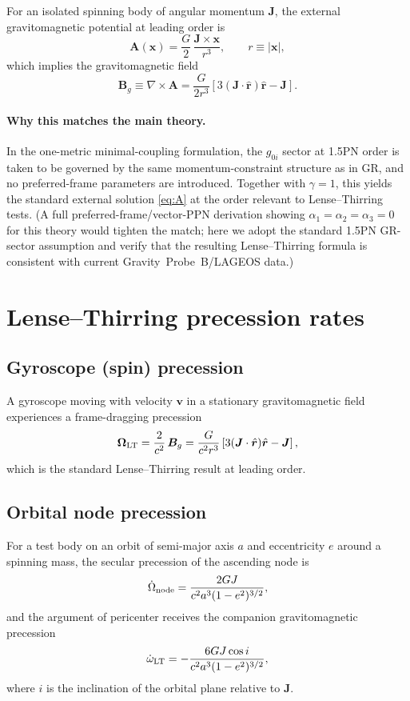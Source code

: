 \documentclass[11pt]{article}
\begin{document}
For an isolated spinning body of angular momentum $\bm{J}$, the external gravitomagnetic potential at leading order is
\begin{equation}
\bm{A}(\bm{x}) = \frac{G}{2}\,\frac{\bm{J}\times \bm{x}}{r^3},
\qquad r\equiv |\bm{x}|,
\label{eq:A}
\end{equation}
which implies the gravitomagnetic field
\begin{equation}
\bm{B}_g \equiv \nabla\times \bm{A} = \frac{G}{2r^3}\left[3(\bm{J}\cdot \hat{\bm{r}})\hat{\bm{r}}-\bm{J}\right].
\label{eq:Bg}
\end{equation}

\paragraph{Why this matches the main theory.}
In the one-metric minimal-coupling formulation, the $g_{0i}$ sector at 1.5PN order is taken to be governed by the same momentum-constraint structure as in GR, and no preferred-frame parameters are introduced. Together with $\gamma=1$, this yields the standard external solution \eqref{eq:A} at the order relevant to Lense--Thirring tests. (A full preferred-frame/vector-PPN derivation showing $\alpha_1=\alpha_2=\alpha_3=0$ for this theory would tighten the match; here we adopt the standard 1.5PN GR-sector assumption and verify that the resulting Lense--Thirring formula is consistent with current Gravity~Probe~B/LAGEOS data.)

\section{Lense--Thirring precession rates}\label{sec:LT}
\subsection{Gyroscope (spin) precession}
A gyroscope moving with velocity $\bm{v}$ in a stationary gravitomagnetic field experiences a frame-dragging precession
\begin{equation}
\bm{\Omega}_{\rm LT} = \frac{2}{c^2}\,\bm{B}_g
= \frac{G}{c^2 r^3}\left[3(\bm{J}\cdot \hat{\bm{r}})\hat{\bm{r}}-\bm{J}\right],
\label{eq:OmegaGyro}
\end{equation}
which is the standard Lense--Thirring result at leading order.

\subsection{Orbital node precession}
For a test body on an orbit of semi-major axis $a$ and eccentricity $e$ around a spinning mass, the secular precession of the ascending node is
\begin{equation}
\dot{\Omega}_{\rm node} = \frac{2GJ}{c^2 a^3(1-e^2)^{3/2}},
\label{eq:node}
\end{equation}
and the argument of pericenter receives the companion gravitomagnetic precession
\begin{equation}
\dot{\omega}_{\rm LT} = -\frac{6GJ\cos i}{c^2 a^3(1-e^2)^{3/2}},
\label{eq:pericenterLT}
\end{equation}
where $i$ is the inclination of the orbital plane relative to $\bm{J}$.
\end{document}
